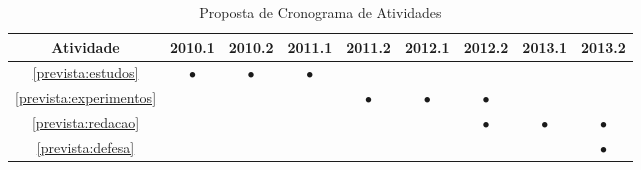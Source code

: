 \documentclass{article}
\newcommand{\newrow}{\\\hline}
\newcommand{\x}{$\bullet$}
\begin{document}
\begin{table}[h]
  \centering
  \begin{tabular}{|c|c|c|c|c|c|c|c|c|} \hline
    Atividade                   & 2010.1 & 2010.2 & 2011.1 & 2011.2  & 2012.1 & 2012.2  & 2013.1 & 2013.2 \newrow
    \ref{prevista:estudos}      & \x     & \x     & \x     &         &        &         &        &        \newrow
    \ref{prevista:experimentos} &        &        &        & \x      & \x     & \x      &        &        \newrow
    \ref{prevista:redacao}      &        &        &        &         &        & \x      & \x     & \x     \newrow
    \ref{prevista:defesa}       &        &        &        &         &        &         &        & \x     \newrow
  \end{tabular}
 \caption{Proposta de Cronograma de Atividades}
 \label{tab:cronograma}
\end{table}




\end{document}
